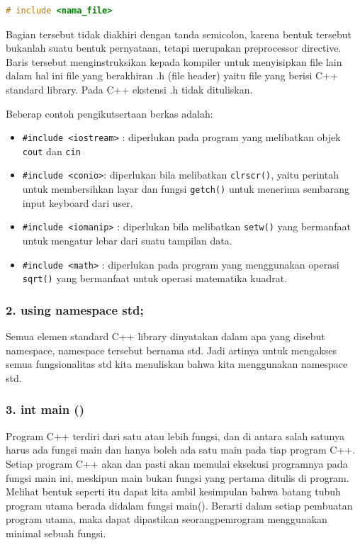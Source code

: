 \begin{lstlisting}[language=c++, numbers=none]
# include <nama_file>
\end{lstlisting}

Bagian tersebut tidak diakhiri dengan tanda semicolon, karena bentuk
tersebut bukanlah suatu bentuk pernyataan, tetapi merupakan preprocessor
directive. Baris tersebut menginstruksikan kepada kompiler untuk
menyisipkan file lain dalam hal ini file yang berakhiran .h (file
header) yaitu file yang berisi C++ standard library. Pada C++ ekstensi
.h tidak dituliskan.

Beberap contoh pengikutsertaan berkas adalah:

\begin{itemize}

\item
  \texttt{\#include\ \textless{}iostream\textgreater{}} : diperlukan
  pada program yang melibatkan objek \texttt{cout} dan \texttt{cin}
\item
  \texttt{\#include\ \textless{}conio\textgreater{}}: diperlukan bila
  melibatkan \texttt{clrscr()}, yaitu perintah untuk membersihkan layar
  dan fungsi \texttt{getch()} untuk menerima sembarang input keyboard
  dari user.
\item
  \texttt{\#include\ \textless{}iomanip\textgreater{}} : diperlukan bila
  melibatkan \texttt{setw()} yang bermanfaat untuk mengatur lebar dari
  suatu tampilan data.
\item
  \texttt{\#include\ \textless{}math\textgreater{}} : diperlukan pada
  program yang menggunakan operasi \texttt{sqrt()} yang bermanfaat untuk
  operasi matematika kuadrat.
\end{itemize}

\subsubsection*{2. using namespace std;}\label{using-namespace-std}

Semua elemen standard C++ library dinyatakan dalam apa yang disebut
namespace, namespace tersebut bernama std. Jadi artinya untuk mengakses
semua fungsionalitas std kita menuliskan bahwa kita menggunakan
namespace std.

\subsubsection*{3. int main ()}\label{int-main}

Program C++ terdiri dari satu atau lebih fungsi, dan di antara salah
satunya harus ada fungsi main dan hanya boleh ada satu main pada tiap
program C++. Setiap program C++ akan dan pasti akan memulai eksekusi
programnya pada fungsi main ini, meskipun main bukan fungsi yang pertama
ditulis di program. Melihat bentuk seperti itu dapat kita ambil
kesimpulan bahwa batang tubuh program utama berada didalam fungsi
main(). Berarti dalam setiap pembuatan program utama, maka dapat
dipastikan seorangpemrogram menggunakan minimal sebuah fungsi.

